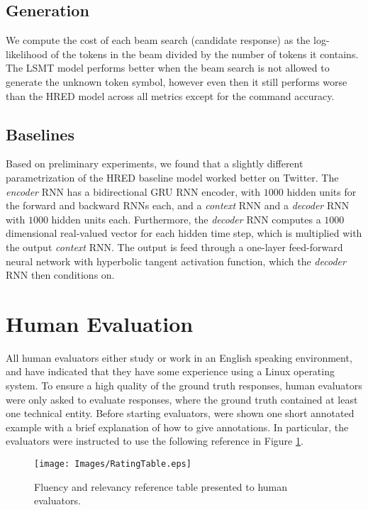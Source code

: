 \documentclass{article}
\begin{document}
\subsection*{Generation}
We compute the cost of each beam search (candidate response) as the log-likelihood of the tokens in the beam divided by the number of tokens it contains.
The LSMT model performs better when the beam search is not allowed to generate the unknown token symbol, however even then it still performs worse than the HRED model across all metrics except for the command accuracy.

\subsection*{Baselines}

Based on preliminary experiments,
we found that a slightly different parametrization of the HRED baseline model worked better on Twitter.
The \textit{encoder} RNN has a bidirectional GRU RNN encoder, with $1000$ hidden units for the forward and backward RNNs each, and a \textit{context} RNN and a \textit{decoder} RNN with $1000$ hidden units each.
Furthermore, the \textit{decoder} RNN computes a $1000$ dimensional real-valued vector for each hidden time step, which is multiplied with the output \textit{context} RNN. The output is feed through a one-layer feed-forward neural network with hyperbolic tangent activation function, which the \textit{decoder} RNN then conditions on.

\section{Human Evaluation} \label{app:human_eval}

All human evaluators either study or work in an English speaking environment,
and have indicated that they have some experience using a Linux operating system.
To ensure a high quality of the ground truth responses, human evaluators were only asked to evaluate responses, where the ground truth contained at least one technical entity.
Before starting evaluators, were shown one short annotated example with a brief explanation of how to give annotations.
In particular, the evaluators were instructed to use the following reference in Figure \ref{tab:fluency_relevancy_table}.

\begin{figure}[ht]
  \centering
  \texttt{[image: Images/RatingTable.eps]}
  \caption{Fluency and relevancy reference table presented to human evaluators.}
  \label{tab:fluency_relevancy_table}
\end{figure}
\end{document}
